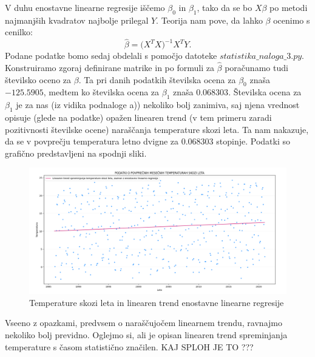 \documentclass{article}
\begin{document}
V duhu enostavne linearne regresije iščemo $\beta_0$ in $\beta_1$, tako da se bo $X \beta$ po metodi najmanjših kvadratov najbolje prilegal $Y$.
Teorija nam pove, da lahko $\beta$ ocenimo s cenilko:
$$
    \hat{\beta} = \Big(X^{T}X\Big)^{-1}X^{T}Y.
$$
Podane podatke bomo sedaj obdelali s pomočjo datoteke $statistika\_naloga\_3.py$. 
Konstruiramo zgoraj definirane matrike in po formuli za $\hat{\beta}$ poračunamo tudi številsko oceno za $\beta$. Ta pri danih podatkih številska ocena za $\beta_0$ znaša $-125.5905$, medtem ko številska ocena za $\beta_1$ znaša $0.068303$.
\newline
Številska ocena za $\beta_1$ je za nas (iz vidika podnaloge a)) nekoliko bolj zanimiva, saj njena vrednost opisuje (glede na podatke) opažen linearen trend (v tem primeru zaradi pozitivnosti številske ocene) naraščanja temperature skozi leta.
Ta nam nakazuje, da se v povprečju temperatura letno dvigne za $0.068303$ stopinje. 
Podatki so grafično predstavljeni na spodnji sliki. 
\begin{figure}[H]
    \begin{center}
    \includegraphics[width=\linewidth]{naloga3a.png}
    \vspace*{-5mm}\caption{Temperature skozi leta in linearen trend enostavne linearne regresije}
    \end{center}    
\end{figure}

Vseeno z opazkami, predvsem o naraščujočem linearnem trendu, ravnajmo nekoliko bolj previdno. 
Oglejmo si, ali je opisan linearen trend spreminjanja temperature s časom statistično značilen. 
\newline
\newline
KAJ SPLOH JE TO ??? 
\newline
\end{document}
